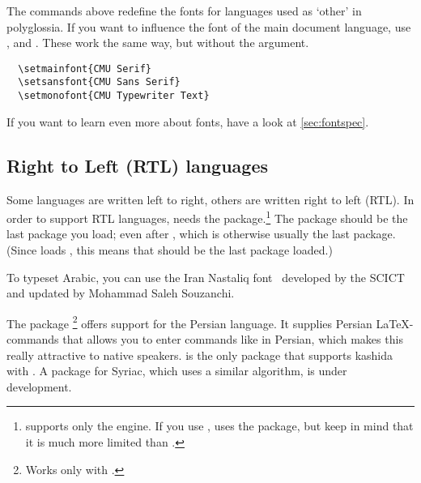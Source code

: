The commands above redefine the fonts for languages used as \enquote*{other} in
polyglossia. If you want to influence the font of the main document language,
use ,  and . These work the
same way, but without the  argument.
\begin{verbatim}
  \setmainfont{CMU Serif}
  \setsansfont{CMU Sans Serif}
  \setmonofont{CMU Typewriter Text}
\end{verbatim}

If you want to learn even more about fonts, have a look at
\autoref{sec:fontspec}.

\subsection{Right to Left (RTL) languages}

Some languages are written left to right, others are written right to left
(RTL). In order to support RTL languages,  needs the
   package.\footnote{
  supports only the  engine. If you use ,
   uses the  package, but keep in mind that it
  is much more limited than .}
The  package should be the last package you load; even after
, which is otherwise usually the last package. (Since
loads , this means that  should be the last package
loaded.)

To typeset Arabic, you can use the Iran Nastaliq font~\cite{font:IranNastaliq}
developed by the SCICT and updated by Mohammad Saleh Souzanchi.

The package \footnote{Works only with
  .} offers support for the Persian language. It
supplies Persian \LaTeX-commands that allows you to enter commands like
 in Persian, which makes this really attractive to native speakers.
 is the only package that supports kashida with
. A package for Syriac, which uses a similar algorithm, is under
development.

